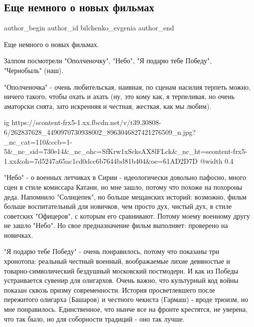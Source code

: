  
 
 
 
 
 
\subsection{Еще немного о новых фильмах}
\label{sec:30_11_2021.fb.bilchenko_evgenia.1.novyje_filmy}
 
\ifcmt
 author_begin
   author_id bilchenko_evgenia
 author_end
\fi

Еще немного о новых фильмах.

Залпом посмотрели "Ополченочку", "Небо", "Я подарю тебе Победу", "Чернобыль"
(наш).

"Ополченочка" - очень любительская, наивная, по сценам насилия терпеть можно,
ничего такого, чтобы охать и ахать (ну, это кому как, я терпеливая, но очень
аматорски снята, зато искренняя и честная, жесткая, как мы любим).

\ifcmt
  ig https://scontent-frx5-1.xx.fbcdn.net/v/t39.30808-6/262837628_4490970730938002_8963046827421276509_n.jpg?_nc_cat=110&ccb=1-5&_nc_sid=730e14&_nc_ohc=SfKrw1xScksAX8lFLck&_nc_ht=scontent-frx5-1.xx&oh=7d5247a65ac1cd0dcc6b7644bd81b404&oe=61AD2D7D
  @width 0.4
\fi

"Небо" - о военных летчиках в Сирии - идеологически довольно пафосно, много
сцен в стиле комиссара Катани, но мне зашло, потому что похоже на похороны
деда. Напомнило "Солнцепек", но больше мещанских историй: возможно, фильм
больше воспитательный для новичков, чем просто дух, чистый дух, в стиле
советских "Офицеров", с которым его сравнивают. Потому моему военному другу не
зашло "Небо". Но свое предназначение фильм выполняет: проверено на новичках.

"Я подарю тебе Победу" - очень понравилось, потому что показаны три хронотопа:
реальный честный военный, воображаемые лихие девяностые и товарно-символический
бездушный московский постмодерн. И как из Победы устраивается сувенир для
олигархов. Очень важно, что культурный код войны показан сквозь призму
современности. История просветлевшего после пережитого олигарха (Башаров) и
честного чекиста (Гармаш) - вроде трюизм, но мне понравилось. Единственное, что
нынче все на фронте крестятся, не уверена, что так было, но для соборности
традиций - оно так лучше.


